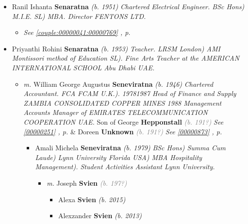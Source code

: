 \documentclass[10pt, openany]{book}
\begin{document}
\begin{itemize}
{\begin{itemize}
{\begin{itemize}
{\begin{itemize}
\item{Ranil Ishanta \textbf{Senaratna} \textcolor{slorange}{\textit{(b. 1951)}} \textcolor{slmaroon}{\textit{Chartered Electrical Engineer.
BSc Hons) M.I.E. SL) MBA.
Director FENTONS LTD.}}
\begin{itemize}
\item{\textcolor{slteal}{\textit{See  \autoref{couple:00000041:00000769} \textit{, p. \pageref{couple:00000041:00000769} }}}}
\end{itemize}
  }
\item{Priyanthi Rohini \textbf{Senaratna} \textcolor{slorange}{\textit{(b. 1953)}} \textcolor{slmaroon}{\textit{Teacher.
LRSM London) AMI Montissori method of Education SL).
Fine Arts Teacher at the AMERICAN INTERNATIONAL SCHOOL Abu Dhabi UAE.}}
\begin{itemize}
\item{\textit{m.} William George Augustus \textbf{Seneviratna} \textcolor{slorange}{\textit{(b. 1946)}} \textcolor{slmaroon}{\textit{Chartered Accountant.
FCA FCAM U.K.).
19781987 Head of Finance and Supply ZAMBIA CONSOLIDATED COPPER MINES 1988 Management Accounts Manager of EMIRATES TELECOMMUNICATION COOPERATION UAE.}} Son of  George \textbf{Hepponstall} \textcolor{gray}{\textit{(b. 191?)}} \textcolor{slteal}{\textit{See  \autoref{00000251} \textit{, p. \pageref{00000251} }}}  \&  Doreen \textbf{Unknown} \textcolor{gray}{\textit{(b. 191?)}} \textcolor{slteal}{\textit{See  \autoref{00000873} \textit{, p. \pageref{00000873} }}}   \label{couple:00000768:00000817} \begin{itemize}
\item{Amali Michela \textbf{Seneviratna} \textcolor{slorange}{\textit{(b. 1979)}} \textcolor{slmaroon}{\textit{BSc Hons) Summa Cum Laude) Lynn University Florida USA) MBA Hospitality Management).
Student Activities Assistant Lynn University.}}
\begin{itemize}
\item{\textit{m.} Joseph \textbf{Svien} \textcolor{gray}{\textit{(b. 197?)}}   \label{couple:00000814:00000850} \begin{itemize}
\item{Alexa \textbf{Svien} \textcolor{slorange}{\textit{(b. 2015)}}
 }
\item{Alexzander \textbf{Svien} \textcolor{slorange}{\textit{(b. 2013)}}
 }
\end{itemize}}
\end{itemize}
}
\end{itemize}}
\end{itemize}}
\end{itemize}}
\end{itemize}}
\end{itemize}}
\end{itemize}
\end{document}
